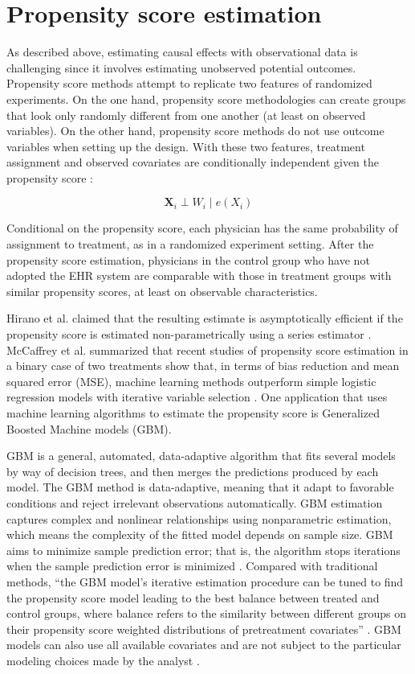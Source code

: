 \documentclass[12pt]{report}
\begin{document}
\section{Propensity score estimation}
As described above, estimating causal effects with observational data is challenging since it involves estimating unobserved potential outcomes. Propensity score methods attempt to replicate two features of randomized experiments. On the one hand, propensity score methodologies can create groups that look only randomly different from one another (at least on observed variables). On the other hand, propensity score methods do not use outcome variables when setting up the design. With these two features, treatment assignment and observed covariates are conditionally independent given the propensity score \citep{guo2014propensity}:

\begin{equation*}
\mathbf{X}_i \perp W_i \mid e(X_i)
\end{equation*}

Conditional on the propensity score, each physician has the same probability of assignment to treatment, as in a randomized experiment setting. After the propensity score estimation, physicians in the control group who have not adopted the EHR system are comparable with those in treatment groups with similar propensity scores, at least on observable characteristics. 

Hirano et al. claimed that the resulting estimate is asymptotically efficient if the propensity score is estimated non-parametrically using a series estimator \citep{hirano2003efficient}. McCaffrey et al. summarized that recent studies of propensity score estimation in a binary case of two treatments show that, in terms of bias reduction and mean squared error (MSE), machine learning methods outperform simple logistic regression models with iterative variable selection \citep{mccaffrey2013tutorial}. One application that uses machine learning algorithms to estimate the propensity score is Generalized Boosted Machine models (GBM).\label{place:gbm}

GBM is a general, automated, data-adaptive algorithm that fits several models by way of decision trees, and then merges the predictions produced by each model. The GBM method is data-adaptive, meaning that it adapt to favorable conditions and reject irrelevant observations automatically. GBM estimation captures complex and nonlinear relationships using nonparametric estimation, which means the complexity of the fitted model depends on sample size. GBM aims to minimize sample prediction error; that is, the algorithm stops iterations when the sample prediction error is minimized \citep{guo2014propensity}. Compared with traditional methods, ``the GBM model's iterative estimation procedure can be tuned to find the propensity score model leading to the best balance between treated and control groups, where balance refers to the similarity between different groups on their propensity score weighted distributions of pretreatment covariates''  \citep{mccaffrey2013tutorial}. GBM models can also use all available covariates and are not subject to the particular modeling choices made by the analyst \citep{hillm2015short}. 
\end{document}
